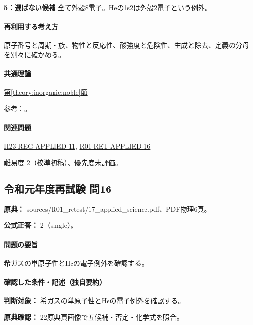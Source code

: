 \noindent\textbf{5：選ばない候補} 全て外殻8電子。Heの1s2は外殻2電子という例外。\par

\paragraph{再利用する考え方} 原子番号と周期・族、物性と反応性、酸強度と危険性、生成と除去、定義の分母を別々に確かめる。

\paragraph{共通理論} \hyperref[theory:inorganic:noble]{第\ref*{theory:inorganic:noble}節}

\par 参考：\cite{inorganic_noble_ref}。

\paragraph{関連問題} \hyperref[q:h23-reg-applied-11]{H23-REG-APPLIED-11}, \hyperref[q:r01-ret-applied-16]{R01-RET-APPLIED-16}

\par 難易度 2（校準初稿）、優先度未評価。

\subsection{令和元年度再試験 問16}
\label{q:r01-ret-applied-16}

\noindent\textbf{原典：} sources/R01\_retest/17\_applied\_science.pdf、PDF物理6頁。

\textbf{公式正答：} 2（single）。

\paragraph{問題の要旨} 希ガスの単原子性とHeの電子例外を確認する。

\paragraph{確認した条件・記述（独自要約）}\mbox{}\par

\noindent\textbf{判断対象：} 希ガスの単原子性とHeの電子例外を確認する。\par

\noindent\textbf{原典確認：} 22原典頁画像で五候補・否定・化学式を照合。\par

